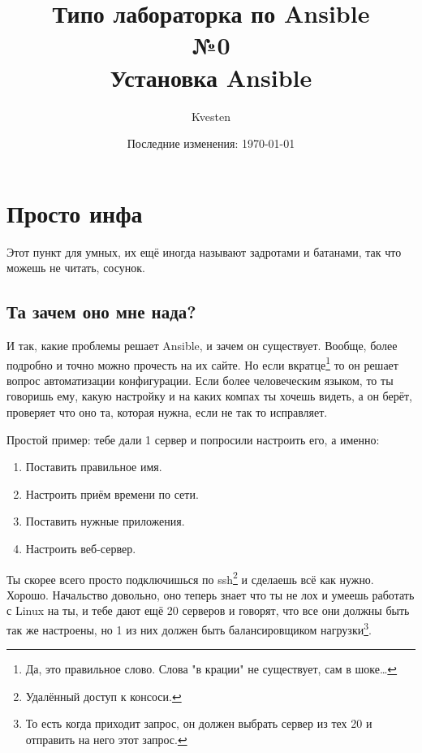 

\title{Типо лабораторка по Ansible\\№0\\Установка Ansible}
\author{Kvesten}
\date{Последние изменения: \today}


    \maketitle\newpage
    \tableofcontents\newpage

    \section{Просто инфа}
        Этот пункт для умных, их ещё иногда называют задротами и батанами, так что можешь не читать, сосунок.

        \subsection{Та зачем оно мне нада?}
            И так, какие проблемы решает Ansible, и зачем он существует. Вообще, более подробно и точно можно прочесть на их сайте. Но если вкратце\footnote{Да, это правильное слово. Слова "в крации" не существует, сам в шоке\dots} то он решает вопрос автоматизации конфигурации. Если более человеческим языком, то ты говоришь ему, какую настройку и на каких компах ты хочешь видеть, а он берёт, проверяет что оно та, которая нужна, если не так то исправляет.

            Простой пример: тебе дали 1 сервер и попросили настроить его, а именно:
            \begin{enumerate}
                \item Поставить правильное имя.
                \item Настроить приём времени по сети.
                \item Поставить нужные приложения.
                \item Настроить веб-сервер.
            \end{enumerate}
            Ты скорее всего просто подключишься по ssh\footnote{Удалённый доступ к консоси.} и сделаешь всё как нужно. Хорошо. Начальство довольно, оно теперь знает что ты не лох и умеешь работать с Linux на ты, и тебе дают ещё 20 серверов и говорят, что все они должны быть так же настроены, но 1 из них должен быть балансировщиком нагрузки\footnote{То есть когда приходит запрос, он должен выбрать сервер из тех 20 и отправить на него этот запрос.}.

